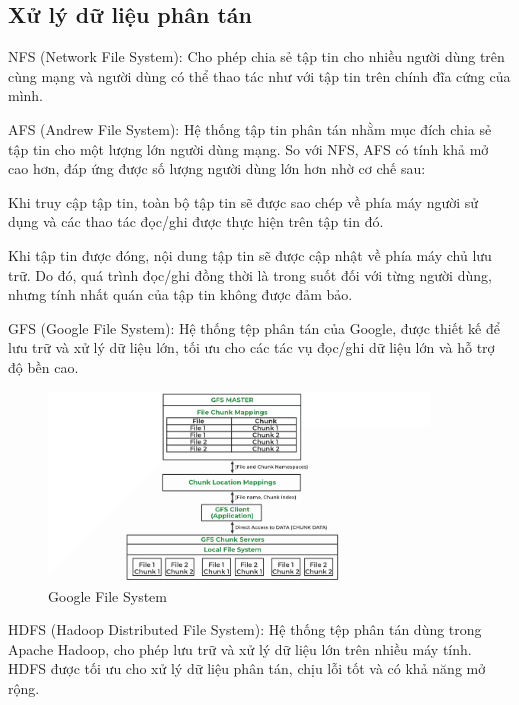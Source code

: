 \subsection{Xử lý dữ liệu phân tán}
\begin{myitem}
  \item NFS (Network File System): Cho phép chia sẻ tập tin cho nhiều người dùng trên cùng mạng và người dùng có thể thao tác như với tập tin trên chính đĩa cứng của mình.

  \item AFS (Andrew File System): Hệ thống tập tin phân tán nhằm mục đích chia sẻ tập tin cho một lượng lớn người dùng mạng. So với NFS, AFS có tính khả mở cao hơn, đáp ứng được số lượng người dùng lớn hơn nhờ cơ chế sau:
    \begin{mysubitem}
      \item Khi truy cập tập tin, toàn bộ tập tin sẽ được sao chép về phía máy người sử dụng và các thao tác đọc/ghi được thực hiện trên tập tin đó.
      \item Khi tập tin được đóng, nội dung tập tin sẽ được cập nhật về phía máy chủ lưu trữ. Do đó, quá trình đọc/ghi đồng thời là trong suốt đối với từng người dùng, nhưng tính nhất quán của tập tin không được đảm bảo.
    \end{mysubitem}

  \item GFS (Google File System): Hệ thống tệp phân tán của Google, được thiết kế để lưu trữ và xử lý dữ liệu lớn, tối ưu cho các tác vụ đọc/ghi dữ liệu lớn và hỗ trợ độ bền cao.

\begin{figure}[H] %
    \centering
    \includegraphics[width=0.9\textwidth]{Tong_quan_DTDM/GFS.png}
    \caption{Google File System}
    \label{fig:cloud_intro}
\end{figure}

  \item HDFS (Hadoop Distributed File System): Hệ thống tệp phân tán dùng trong Apache Hadoop, cho phép lưu trữ và xử lý dữ liệu lớn trên nhiều máy tính. HDFS được tối ưu cho xử lý dữ liệu phân tán, chịu lỗi tốt và có khả năng mở rộng.


\end{myitem}
